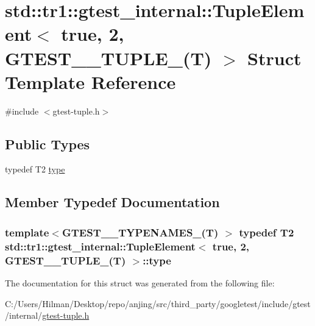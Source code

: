\hypertarget{structstd_1_1tr1_1_1gtest__internal_1_1_tuple_element_3_01true_00_012_00_01_g_t_e_s_t__10___t_u_p_l_e___07_t_08_01_4}{}\section{std\+:\+:tr1\+:\+:gtest\+\_\+internal\+:\+:Tuple\+Element$<$ true, 2, G\+T\+E\+S\+T\+\_\+\_\+\+T\+U\+P\+L\+E\+\_\+(T) $>$ Struct Template Reference}
\label{structstd_1_1tr1_1_1gtest__internal_1_1_tuple_element_3_01true_00_012_00_01_g_t_e_s_t__10___t_u_p_l_e___07_t_08_01_4}


{\ttfamily \#include $<$gtest-\/tuple.\+h$>$}

\subsection*{Public Types}
\begin{DoxyCompactItemize}
\item 
typedef T2 \hyperlink{structstd_1_1tr1_1_1gtest__internal_1_1_tuple_element_3_01true_00_012_00_01_g_t_e_s_t__10___t_u_p_l_e___07_t_08_01_4_a2162d0e4f4c93fb1fdedb1938b844fbe}{type}
\end{DoxyCompactItemize}


\subsection{Member Typedef Documentation}
\hypertarget{structstd_1_1tr1_1_1gtest__internal_1_1_tuple_element_3_01true_00_012_00_01_g_t_e_s_t__10___t_u_p_l_e___07_t_08_01_4_a2162d0e4f4c93fb1fdedb1938b844fbe}{}
\subsubsection[{type}]{\setlength{\rightskip}{0pt plus 5cm}template$<$G\+T\+E\+S\+T\+\_\+\_\+\+T\+Y\+P\+E\+N\+A\+M\+E\+S\+\_\+(\+T) $>$ typedef T2 {\bf std\+::tr1\+::gtest\+\_\+internal\+::\+Tuple\+Element}$<$ true, 2, {\bf G\+T\+E\+S\+T\+\_\+\_\+\+T\+U\+P\+L\+E\+\_\+}(T) $>$\+::{\bf type}}\label{structstd_1_1tr1_1_1gtest__internal_1_1_tuple_element_3_01true_00_012_00_01_g_t_e_s_t__10___t_u_p_l_e___07_t_08_01_4_a2162d0e4f4c93fb1fdedb1938b844fbe}


The documentation for this struct was generated from the following file\+:\begin{DoxyCompactItemize}
\item 
C\+:/\+Users/\+Hilman/\+Desktop/repo/anjing/src/third\+\_\+party/googletest/include/gtest/internal/\hyperlink{gtest-tuple_8h}{gtest-\/tuple.\+h}\end{DoxyCompactItemize}
